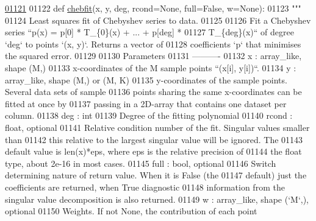 \begin{DoxyCode}
\hypertarget{namespacepyneb_1_1utils_1_1chebyshev_l01121}{}\hyperlink{namespacepyneb_1_1utils_1_1chebyshev_a6bb5eb95525fd0572aea52fcd2a12c6c}{01121} 
01122 \textcolor{keyword}{def }\hyperlink{namespacepyneb_1_1utils_1_1chebyshev_a6bb5eb95525fd0572aea52fcd2a12c6c}{chebfit}(x, y, deg, rcond=None, full=False, w=None):
01123     \textcolor{stringliteral}{"""}
01124 \textcolor{stringliteral}{    Least squares fit of Chebyshev series to data.}
01125 \textcolor{stringliteral}{}
01126 \textcolor{stringliteral}{    Fit a Chebyshev series ``p(x) = p[0] * T\_\{0\}(x) + ... + p[deg] *}
01127 \textcolor{stringliteral}{    T\_\{deg\}(x)`` of degree `deg` to points `(x, y)`. Returns a vector of}
01128 \textcolor{stringliteral}{    coefficients `p` that minimises the squared error.}
01129 \textcolor{stringliteral}{}
01130 \textcolor{stringliteral}{    Parameters}
01131 \textcolor{stringliteral}{    ----------}
01132 \textcolor{stringliteral}{    x : array\_like, shape (M,)}
01133 \textcolor{stringliteral}{        x-coordinates of the M sample points ``(x[i], y[i])``.}
01134 \textcolor{stringliteral}{    y : array\_like, shape (M,) or (M, K)}
01135 \textcolor{stringliteral}{        y-coordinates of the sample points. Several data sets of sample}
01136 \textcolor{stringliteral}{        points sharing the same x-coordinates can be fitted at once by}
01137 \textcolor{stringliteral}{        passing in a 2D-array that contains one dataset per column.}
01138 \textcolor{stringliteral}{    deg : int}
01139 \textcolor{stringliteral}{        Degree of the fitting polynomial}
01140 \textcolor{stringliteral}{    rcond : float, optional}
01141 \textcolor{stringliteral}{        Relative condition number of the fit. Singular values smaller than}
01142 \textcolor{stringliteral}{        this relative to the largest singular value will be ignored. The}
01143 \textcolor{stringliteral}{        default value is len(x)*eps, where eps is the relative precision of}
01144 \textcolor{stringliteral}{        the float type, about 2e-16 in most cases.}
01145 \textcolor{stringliteral}{    full : bool, optional}
01146 \textcolor{stringliteral}{        Switch determining nature of return value. When it is False (the}
01147 \textcolor{stringliteral}{        default) just the coefficients are returned, when True diagnostic}
01148 \textcolor{stringliteral}{        information from the singular value decomposition is also returned.}
01149 \textcolor{stringliteral}{    w : array\_like, shape (`M`,), optional}
01150 \textcolor{stringliteral}{        Weights. If not None, the contribution of each point}

\end{DoxyCode}
